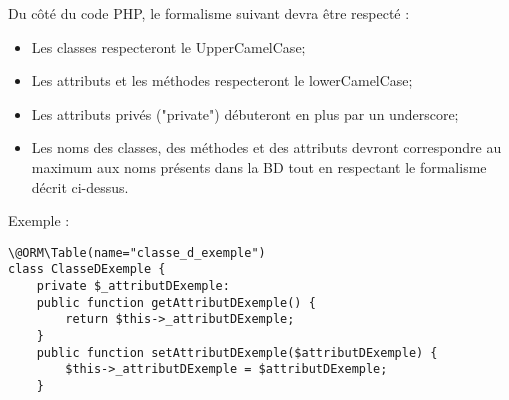 Du côté du code PHP, le formalisme suivant devra être respecté : 
\begin{itemize}
\item Les classes respecteront le UpperCamelCase;
\item Les attributs et les méthodes respecteront le lowerCamelCase;
\item Les attributs privés ("private") débuteront en plus par un underscore;
\item Les noms des classes, des méthodes et des attributs devront correspondre au maximum aux noms présents dans la BD tout en respectant le formalisme décrit ci-dessus. \\
\end{itemize}
Exemple : \\
\begin{verbatim}
\@ORM\Table(name="classe_d_exemple")
class ClasseDExemple {
	private $_attributDExemple:
	public function getAttributDExemple() {
		return $this->_attributDExemple;
	}
	public function setAttributDExemple($attributDExemple) {
		$this->_attributDExemple = $attributDExemple;
	}
\end{verbatim}